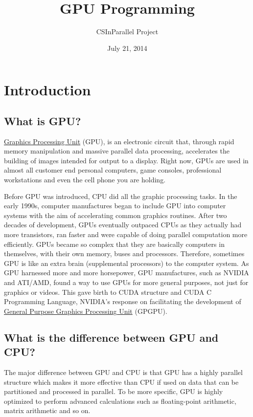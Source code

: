\documentclass[letterpaper,10pt,openany,oneside]{sphinxmanual}
\title{GPU Programming}
\date{July 21, 2014}
\author{CSInParallel Project}
\begin{document}
\maketitle
\tableofcontents
{}\label{index::doc}



\chapter{Introduction}
\label{Introduction/Introduction:introduction}\label{Introduction/Introduction:gpu-programming}\label{Introduction/Introduction::doc}

\section{What is GPU?}
\label{Introduction/Introduction:what-is-gpu}
\href{http://en.wikipedia.org/wiki/GPU}{Graphics Processing Unit} (GPU), is an electronic circuit that, through rapid memory manipulation and massive parallel data processing, accelerates the building of images intended for output to a display. Right now, GPUs are used in almost all customer end personal computers, game consoles, professional workstations and even the cell phone you are holding.

Before GPU was introduced, CPU did all the graphic processing tasks. In the early 1990s, computer manufactures began to include GPU into computer systems with the aim of accelerating common graphics routines. After two decades of development, GPUs eventually outpaced CPUs as they actually had more transistors, ran faster and were capable of doing parallel computation more efficiently. GPUs became so complex that they are basically computers in themselves, with their own memory, buses and processors. Therefore, sometimes GPU is like an extra brain (supplemental processors) to the computer system. As GPU harnessed more and more horsepower, GPU manufactures, such as NVIDIA and ATI/AMD, found a way to use GPUs  for more general purposes, not just for graphics or videos. This gave birth to CUDA structure and CUDA C Programming Language, NVIDIA's response on facilitating the development of \href{http://en.wikipedia.org/wiki/GPGPU}{General Purpose Graphics Processing Unit} (GPGPU).


\section{What is the difference between GPU and CPU?}
\label{Introduction/Introduction:general-purpose-graphics-processing-unit}\label{Introduction/Introduction:what-is-the-difference-between-gpu-and-cpu}
The major difference between GPU and CPU is that GPU has a highly parallel structure which makes it more effective than CPU if used on data that can be partitioned and processed in parallel. To be more specific, GPU is highly optimized to perform advanced calculations such as floating-point arithmetic, matrix arithmetic and so on.
\end{document}
